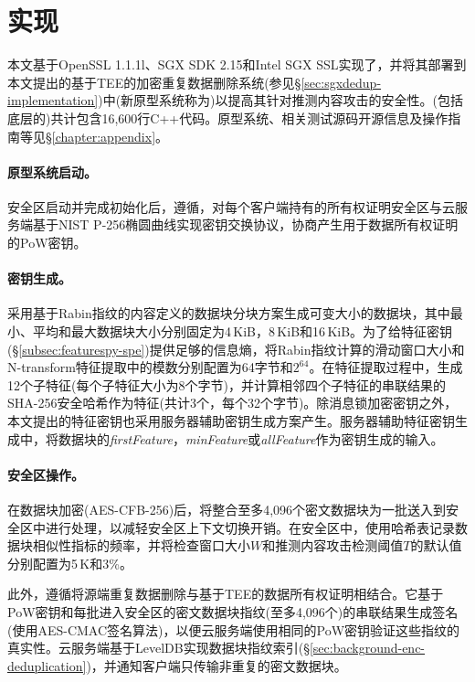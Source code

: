 \section{\prototype 实现}
\label{sec:featurespy-implementation}
本文基于OpenSSL 1.1.1l、SGX SDK 2.15和Intel SGX SSL实现了\sysnameF，并将其部署到本文提出的基于TEE的加密重复数据删除系统\sysnameS (参见\S\ref{sec:sgxdedup-implementation})中(新原型系统称为\prototype)以提高其针对推测内容攻击的安全性。\prototype(包括底层的\sysnameS )共计包含16,600行C++代码。原型系统、相关测试源码开源信息及操作指南等见\S\ref{chapter:appendix}。

\paragraph*{原型系统启动。}
安全区启动并完成初始化后，\prototype 遵循\sysnameS，对每个客户端持有的所有权证明安全区与云服务端基于NIST P-256椭圆曲线实现密钥交换协议，协商产生用于数据所有权证明的PoW密钥。

\paragraph*{密钥生成。}
\prototype 采用基于Rabin指纹的内容定义的数据块分块方案生成可变大小的数据块，其中最小、平均和最大数据块大小分别固定为4\,KiB，8\,KiB和16\,KiB。为了给特征密钥(\S\ref{subsec:featurespy-spe})提供足够的信息熵，将Rabin指纹计算的滑动窗口大小和N-transform特征提取中的模数分别配置为64字节和$2^{64}$。在特征提取过程中，生成12个子特征(每个子特征大小为8个字节)，并计算相邻四个子特征的串联结果的SHA-256安全哈希作为特征(共计3个，每个32个字节)。除消息锁加密密钥之外，本文提出的特征密钥也采用服务器辅助密钥生成方案产生。服务器辅助特征密钥生成中，将数据块的\textit{firstFeature}，\textit{minFeature}或\textit{allFeature}作为密钥生成的输入。

\paragraph*{安全区操作。}
在数据块加密(AES-CFB-256)后，\prototype 将整合至多4,096个密文数据块为一批送入到安全区中进行处理，以减轻安全区上下文切换开销。在安全区中，\prototype 使用哈希表记录数据块相似性指标的频率，并将检查窗口大小$W$和推测内容攻击检测阈值$T$的默认值分别配置为5\,K和3\%。

此外，\prototype 遵循\sysnameS 将源端重复数据删除与基于TEE的数据所有权证明相结合。它基于PoW密钥和每批进入安全区的密文数据块指纹(至多4,096个)的串联结果生成签名(使用AES-CMAC签名算法)，以便云服务端使用相同的PoW密钥验证这些指纹的真实性。云服务端基于LevelDB实现数据块指纹索引(\S\ref{sec:background-enc-deduplication})，并通知客户端只传输非重复的密文数据块。

